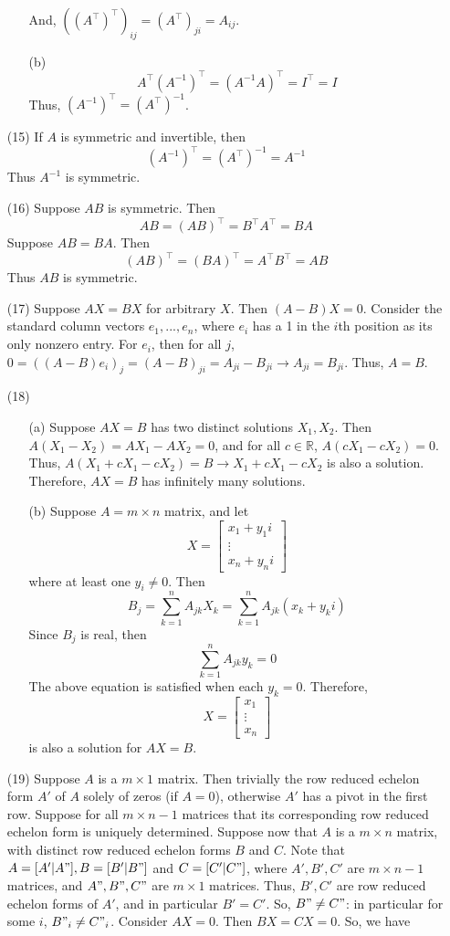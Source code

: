 \begin{itemize}
\begin{itemize}
And, $((A^\top)^\top)_{ij} = (A^\top)_{ji} = A_{ij}$.
\item[(b)]
$$A^\top(A^{-1})^\top = (A^{-1}A)^\top = I^\top = I$$
Thus, $(A^{-1})^\top = (A^\top)^{-1}$.
\end{itemize}
\item[(15)]
If $A$ is symmetric and invertible, then
$$(A^{-1})^\top = (A^\top)^{-1} = A^{-1}$$
Thus $A^{-1}$ is symmetric.
\item[(16)]
Suppose $AB$ is symmetric. Then
$$AB = (AB)^\top = B^\top A^\top = BA$$
Suppose $AB = BA$. Then
$$(AB)^\top = (BA)^\top = A^\top B^\top = AB$$
Thus $AB$ is symmetric.
\item[(17)]
Suppose $AX = BX$ for arbitrary $X$. Then $(A - B)X = 0$. Consider the standard column vectors $e_1, ..., e_n$, where $e_i$ has a 1 in the $i$th position as its only nonzero entry. For $e_i$, then for all $j$, $0 = ((A - B)e_i)_j = (A - B)_{ji} = A_{ji} - B_{ji} \rightarrow A_{ji} = B_{ji}$. Thus, $A = B$.
\item[(18)]
\begin{itemize}
\item[(a)] Suppose $AX = B$ has two distinct solutions $X_1, X_2$. Then $A(X_1 - X_2) = AX_1 - AX_2 = 0$, and for all $c \in \mathbb{R}$, $A(cX_1 - cX_2) = 0$. Thus, $A(X_1 + cX_1 - cX_2) = B \rightarrow X_1 + cX_1 - cX_2$ is also a solution. Therefore, $AX = B$ has infinitely many solutions.
\item[(b)]
Suppose $A = m \times n$ matrix, and let
$$X = \begin{bmatrix}
x_1 + y_1i \\
\vdots \\
x_n + y_ni
\end{bmatrix}$$
where at least one $y_i \neq 0$. Then
$$B_j = \sum_{k=1}^n A_{jk}X_k = \sum_{k=1}^n A_{jk}(x_k + y_ki)$$
Since $B_j$ is real, then
$$\sum_{k=1}^n A_{jk}y_{k} = 0$$
The above equation is satisfied when each $y_{k} = 0$. Therefore,
$$X = \begin{bmatrix}
x_1 \\
\vdots \\
x_n
\end{bmatrix}$$
is also a solution for $AX = B$.
\end{itemize}
\item[(19)]
Suppose $A$ is a $m \times 1$ matrix. Then trivially the row reduced echelon form $A'$ of $A$ solely of zeros (if $A = 0$), otherwise $A'$ has a pivot in the first row. Suppose for all $m \times n - 1$ matrices that its corresponding row reduced echelon form is uniquely determined. Suppose now that $A$ is a $m \times n$ matrix, with distinct row reduced echelon forms $B$ and $C$. Note that $A = [A' | A"], B = [B' | B"]$ and $C = [C' | C"]$, where $A', B', C'$ are $m \times n - 1$ matrices, and $A", B", C"$ are $m \times 1$ matrices. Thus, $B', C'$ are row reduced echelon forms of $A'$, and in particular $B' = C'$. So, $B" \neq C"$: in particular for some $i$, $B"_i \neq C"_i$. Consider $AX = 0$. Then $BX = CX = 0$. So, we have

\end{itemize}
